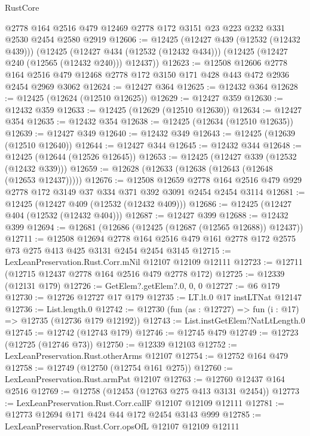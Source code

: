 \begin{lexlean}{RustCore}
\begin{coremodule}
    @2778
    @164
    @2516
    @479
    @12469
    @2778
    @172
    @3151
    @23
    @223
    @232
    @331
    @2530
    @2454
    @2580
    @2919
@12606 := @12425
    (@12427 @439 (@12532 (@12432 @439)))
    (@12425
      (@12427 @434 (@12532 (@12432 @434)))
      (@12425 (@12427 @240 (@12565 (@12432 @240))) @12437))
@12623 := @12508
    @12606
    @2778
    @164
    @2516
    @479
    @12468
    @2778
    @172
    @3150
    @171
    @428
    @443
    @472
    @2936
    @2454
    @2969
    @3062
@12624 := @12427 @364
@12625 := @12432 @364
@12628 := @12425 (@12624 (@12510 @12625))
@12629 := @12427 @359
@12630 := @12432 @359
@12633 := @12425 (@12629 (@12510 @12630))
@12634 := @12427 @354
@12635 := @12432 @354
@12638 := @12425 (@12634 (@12510 @12635))
@12639 := @12427 @349
@12640 := @12432 @349
@12643 := @12425 (@12639 (@12510 @12640))
@12644 := @12427 @344
@12645 := @12432 @344
@12648 := @12425 (@12644 (@12526 @12645))
@12653 := @12425 (@12427 @339 (@12532 (@12432 @339)))
@12659 := @12628 (@12633 (@12638 (@12643 (@12648 (@12653 @12437)))))
@12676 := @12508
    @12659
    @2778
    @164
    @2516
    @479
    @929
    @2778
    @172
    @3149
    @37
    @334
    @371
    @392
    @3091
    @2454
    @2454
    @3114
@12681 := @12425 (@12427 @409 (@12532 (@12432 @409)))
@12686 := @12425 (@12427 @404 (@12532 (@12432 @404)))
@12687 := @12427 @399
@12688 := @12432 @399
@12694 := @12681 (@12686 (@12425 (@12687 (@12565 @12688)) @12437))
@12711 := @12508
    @12694
    @2778
    @164
    @2516
    @479
    @161
    @2778
    @172
    @2575
    @73
    @275
    @413
    @425
    @3131
    @2454
    @2454
    @3145
@12715 := LexLeanPreservation.Rust.Corr.mNil @12107 @12109 @12111
@12723 := @12711 (@12715 @12437 @2778 @164 @2516 @479 @2778 @172)
@12725 := @12339 (@12131 @179)
@12726 := GetElem?.getElem?.{0, 0, 0}
@12727 := @6 @179
@12730 := @12726 @12727 @17 @179
@12735 := LT.lt.{0} @17 instLTNat @12147
@12736 := List.length.{0}
@12742 := @12730 (fun (as : @12727) => fun (i : @17) => @12735 (@12736 @179 @12192))
@12743 := List.instGetElem?NatLtLength.{0}
@12745 := @12742 (@12743 @179)
@12746 := @12745 @479
@12749 := @12723 (@12725 (@12746 @73))
@12750 := @12339 @12103
@12752 := LexLeanPreservation.Rust.otherArms @12107
@12754 := @12752 @164 @479
@12758 := @12749 (@12750 (@12754 @161 @275))
@12760 := LexLeanPreservation.Rust.armPat @12107
@12763 := @12760 @12437 @164 @2516
@12769 := @12758 (@12453 (@12763 @275 @413 @3131 @2454))
@12773 := LexLeanPreservation.Rust.Corr.callF @12107 @12109 @12111
@12781 := @12773 @12694 @171 @424 @44 @172 @2454 @3143 @999
@12785 := LexLeanPreservation.Rust.Corr.opsOfL @12107 @12109 @12111

\end{coremodule}
\end{lexlean}
